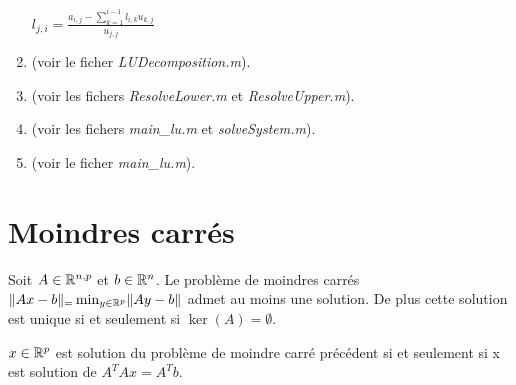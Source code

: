 \documentclass[a4paper,10pt]{article}
\begin{document}
\begin{enumerate}
\begin{algorithm}
\begin{algorithmic}
        \STATE $l_{j, i} = \displaystyle \frac{a_{i, j} - \sum_{k = 1}^{i - 1} l_{i, k} u_{k, j}}{u_{j, j}}$
    \ENDFOR
\ENDFOR
\end{algorithmic}
\end{algorithm}

    \item (voir le ficher \emph{LUDecomposition.m}).
    \item (voir les fichers \emph{ResolveLower.m} et \emph{ResolveUpper.m}).
    \item (voir les fichers \emph{main\_lu.m} et \emph{solveSystem.m}).
    \item (voir le ficher \emph{main\_lu.m}).
\end{enumerate}

\section{Moindres carrés}
\begin{prop}
    Soit $A \in \mathbb{R}^{n, p}$ et $b \in \mathbb{R}^n$. Le problème de moindres carrés $\lVert Ax - b\rVert_{=} \min_{y \in \mathbb{R}^p} \lVert Ay - b\rVert_{}$ admet au moins une solution. De plus cette
solution est unique si et seulement si $\ker(A) = \emptyset$.
\end{prop}

\begin{prop}
$x \in \mathbb{R}^p$ est solution du problème de moindre carré précédent si et seulement si
x est solution de $A^T A x = A^T b$.
\end{prop}
\end{document}
